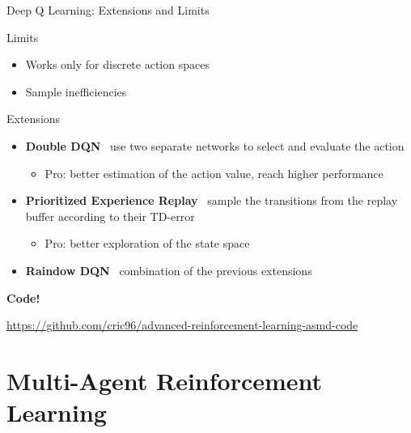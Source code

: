 \documentclass[presentation, 9pt]{beamer}\mode<presentation>{\usetheme{AMSBolognaFC}}
\begin{document}
\begin{frame}{Deep Q Learning: Extensions and Limits}
	\begin{block}{Limits}
		\begin{itemize}
			\item Works only for discrete action spaces
			\item Sample inefficiencies
		\end{itemize}
	\end{block}
	\begin{block}{Extensions}
		\begin{itemize}
			\item \textbf{Double DQN} \faArrowRight \, use two separate networks to select and evaluate the action
			\begin{itemize}
				\item Pro: better estimation of the action value, reach higher performance
			\end{itemize}
			\item \textbf{Prioritized Experience Replay} \faArrowRight \, sample the transitions from the replay buffer according to their TD-error
			\begin{itemize}
				\item Pro: better exploration of the state space
			\end{itemize}
			\item \textbf{Raindow DQN} \faArrowRight \, combination of the previous extensions
		\end{itemize}
	\end{block}
\end{frame}
\begin{frame}[plain]
\begin{center}
	\Huge{\textbf{Code!}}
\end{center}
\centering
\small{\url{https://github.com/cric96/advanced-reinforcement-learning-asmd-code}}
\end{frame}
\section{Multi-Agent Reinforcement Learning}
\end{document}
